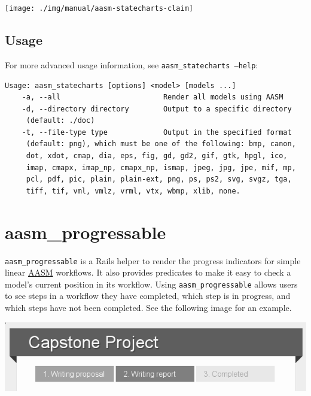 \documentclass[document.tex]{subfiles}
\begin{document}
\vspace{5mm}

\begin{center}
 \texttt{[image: ./img/manual/aasm-statecharts-claim]}
\end{center}


\subsection{Usage}

For more advanced usage information, see {\tt aasm\_statecharts --help}:

\begin{verbatim}Usage: aasm_statecharts [options] <model> [models ...]
    -a, --all                        Render all models using AASM
    -d, --directory directory        Output to a specific directory
     (default: ./doc)
    -t, --file-type type             Output in the specified format
     (default: png), which must be one of the following: bmp, canon,
     dot, xdot, cmap, dia, eps, fig, gd, gd2, gif, gtk, hpgl, ico,
     imap, cmapx, imap_np, cmapx_np, ismap, jpeg, jpg, jpe, mif, mp,
     pcl, pdf, pic, plain, plain-ext, png, ps, ps2, svg, svgz, tga,
     tiff, tif, vml, vmlz, vrml, vtx, wbmp, xlib, none.
\end{verbatim}



\section{aasm\_progressable}
\label {sec:aasm-progressable-manual}

{\tt aasm\_progressable} is a Rails helper to render the progress indicators for simple linear \href{https://github.com/aasm/aasm}{AASM} workflows. It also provides predicates to make it easy to check a model's current position in its workflow. Using {\tt aasm\_progressable} allows users to see steps in a workflow they have completed, which step is in progress, and which steps have not been completed. See the following image for an example.

\vspace{5mm}

\begin{center}
 \includegraphics[width=6.0in]{./img/manual/aasm-progressable-example}
\end{center}
\end{document}
